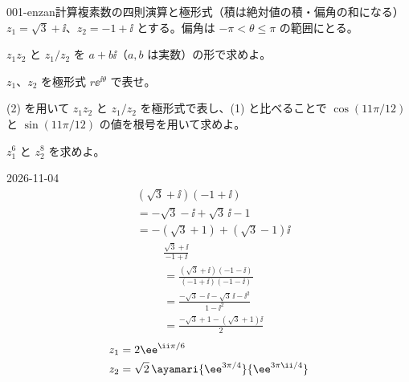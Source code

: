 \documentclass[uplatex,dvipdfmx,a4paper,11pt]{jsarticle}
\begin{document}
\begin{kirokuichiran}
\end{kirokuichiran}

\mondaihen
{}
\begin{mondai}{001-enzan}{計算}{複素数の四則演算と極形式（積は絶対値の積・偏角の和になる）}
$z_{1}=\sqrt{3}+\ii$、$z_{2}=-1+\ii$ とする。偏角は $-\pi<\theta\le\pi$ の範囲にとる。
  \begin{shoumon}
    \item $z_{1}z_{2}$ と $z_{1}/z_{2}$ を $a+b\ii$（$a,b$ は実数）の形で求めよ。
    \item $z_{1}$、$z_{2}$ を極形式 $r\ee^{\ii\theta}$ で表せ。
    \item (2) を用いて $z_{1}z_{2}$ と $z_{1}/z_{2}$ を極形式で表し、(1) と比べることで $\cos(11\pi/12)$ と $\sin(11\pi/12)$ の値を根号を用いて求めよ。
    \item $z_{1}^{6}$ と $z_{2}^{8}$ を求めよ。
  \end{shoumon}
\begin{kotaeutsushi}{2026-11-04}
\begin{align*}
&(\sqrt{3}+\ii)(-1+\ii)\\
&=-\sqrt{3}-\ii+\sqrt{3}\,\ii-1\\
&=-(\sqrt{3}+1)+(\sqrt{3}-1)\ii
\end{align*}
\begin{align*}
&\frac{\sqrt{3}+\ii}{-1+\ii}\\
&=\frac{(\sqrt{3}+\ii)(-1-\ii)}{(-1+\ii)(-1-\ii)}\\
&=\frac{-\sqrt{3}-\ii-\sqrt{3}\,\ii-\ii^{2}}{1-\ii^{2}}\\
&=\frac{-\sqrt{3}+1-(\sqrt{3}+1)\ii}{2}
\end{align*}
\begin{align*}
z_{1}&=2\ee^{\ii\pi/6}\\
z_{2}&=\sqrt{2}\,\ayamari{\ee^{3\pi/4}}{\ee^{3\pi\ii/4}}

\end{align*}
\end{kotaeutsushi}
\end{mondai}
\end{document}
